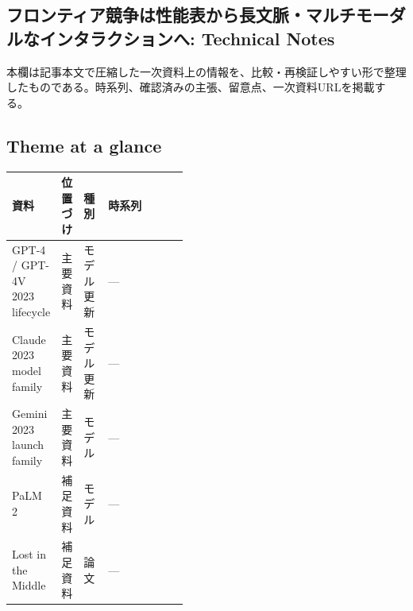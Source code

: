 \subsection*{フロンティア競争は性能表から長文脈・マルチモーダルなインタラクションへ: Technical Notes}
本欄は記事本文で圧縮した一次資料上の情報を、比較・再検証しやすい形で整理したものである。時系列、確認済みの主張、留意点、一次資料URLを掲載する。
\smallskip
{}\par
\medskip
\subsection*{Theme at a glance}
\begin{center}
\footnotesize
\begin{tabularx}{\linewidth}{@{}p{0.20\linewidth}p{0.10\linewidth}p{0.14\linewidth}X@{}}
\toprule
資料 & 位置づけ & 種別 & 時系列 \\
\midrule
GPT-4 / GPT-4V 2023 lifecycle & 主要資料 & モデル更新 & — \\
Claude 2023 model family & 主要資料 & モデル更新 & — \\
Gemini 2023 launch family & 主要資料 & モデル & — \\
PaLM 2 & 補足資料 & モデル & — \\
Lost in the Middle & 補足資料 & 論文 & — \\
\bottomrule
\end{tabularx}
\end{center}
\normalsize

